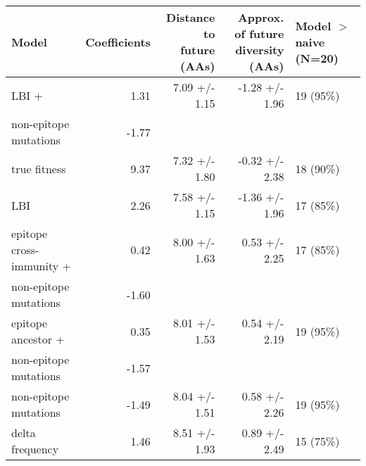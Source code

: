\begin{tabular*}{1.0\textwidth}{lrrrl}
\toprule
                             Model & Coefficients & \makecell{Distance to \\ future (AAs)} & \makecell{Approx. of future \\ diversity (AAs)} & \makecell[l]{Model $>$ naive \\ (N=20)} \\
\midrule
                             LBI + &         1.31 &                          7.09 +/- 1.15 &                                  -1.28 +/- 1.96 &                               19 (95\%) \\
 \hspace{3mm}non-epitope mutations &        -1.77 &                                        &                                                 &                                         \\
                      true fitness &         9.37 &                          7.32 +/- 1.80 &                                  -0.32 +/- 2.38 &                               18 (90\%) \\
                               LBI &         2.26 &                          7.58 +/- 1.15 &                                  -1.36 +/- 1.96 &                               17 (85\%) \\
          epitope cross-immunity + &         0.42 &                          8.00 +/- 1.63 &                                   0.53 +/- 2.25 &                               17 (85\%) \\
 \hspace{3mm}non-epitope mutations &        -1.60 &                                        &                                                 &                                         \\
                epitope ancestor + &         0.35 &                          8.01 +/- 1.53 &                                   0.54 +/- 2.19 &                               19 (95\%) \\
 \hspace{3mm}non-epitope mutations &        -1.57 &                                        &                                                 &                                         \\
             non-epitope mutations &        -1.49 &                          8.04 +/- 1.51 &                                   0.58 +/- 2.26 &                               19 (95\%) \\
                   delta frequency &         1.46 &                          8.51 +/- 1.93 &                                   0.89 +/- 2.49 &                               15 (75\%) \\

\end{tabular*}
